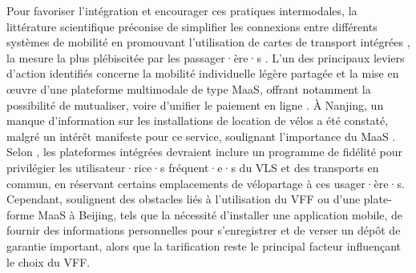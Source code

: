 \begin{refsegment}
Pour favoriser l'intégration et encourager ces pratiques intermodales, la littérature scientifique préconise de simplifier les connexions entre différents systèmes de mobilité en promouvant l'utilisation de cartes de transport intégrées \textcolor{blue}{\autocite[172]{yang_bike-and-ride_2014}}, la mesure la plus plébiscitée par les passager·ère·s \textcolor{blue}{\autocite[10]{yang_empirical_2016}}. L'un des principaux leviers d'action identifiés concerne la mobilité individuelle légère partagée et la mise en œuvre d'une plateforme multimodale de type \acrshort{MaaS}, offrant notamment la possibilité de mutualiser, voire d'unifier le paiement en ligne \textcolor{blue}{\autocite[5]{fearnley_patterns_2020}}. À Nanjing, un manque d'information sur les installations de location de vélos a été constaté, malgré un intérêt manifeste pour ce service, soulignant l'importance du \acrshort{MaaS} \textcolor{blue}{\autocite[136]{chen_determinants_2012}}. Selon \textcolor{blue}{\textcite[67]{ma_understanding_2018}}, les plateformes intégrées devraient inclure un programme de fidélité pour privilégier les utilisateur·rice·s fréquent·e·s du \acrshort{VLS} et des transports en commun, en réservant certains emplacements de vélopartage à ces usager·ère·s. Cependant, \textcolor{blue}{\textcite[12]{fan_how_2019}} soulignent des obstacles liés à l'utilisation du \acrshort{VFF} ou d'une plate-forme \acrshort{MaaS} à Beijing, tels que la nécessité d'installer une application mobile, de fournir des informations personnelles pour s'enregistrer et de verser un dépôt de garantie important, alors que la tarification reste le principal facteur influençant le choix du \acrshort{VFF}.%


\end{refsegment}
